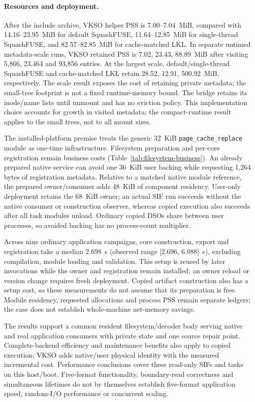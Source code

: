 \paragraph{Resources and deployment.}
After the include archive, VKSO helper PSS is 7.00--7.04~MiB, compared with 14.16--23.95~MiB for default SquashFUSE, 11.64--12.85~MiB for single-thread SquashFUSE, and 82.57--82.85~MiB for cache-matched LKL. In separate untimed metadata-scale runs, VKSO retained PSS is 7.02, 23.43, 88.89~MiB after visiting 5,866, 23,464 and 93,856 entries. At the largest scale, default/single-thread SquashFUSE and cache-matched LKL retain 28.52, 12.91, 500.92~MiB, respectively. The scale result exposes the cost of retaining private metadata; the small-tree footprint is not a fixed runtime-memory bound.
The bridge retains its inode/name lists until unmount and has no eviction
policy. This implementation choice accounts for growth in visited metadata;
the compact-runtime result applies to the small trees, not to all mount sizes.

The installed-platform premise treats the generic 32~KiB
\texttt{page\_cache\_replace} module as one-time infrastructure. Filesystem
preparation and per-core registration remain business costs
(Table~\ref{tab:filesystem-business}).
An already prepared native service can avoid one 36~KiB user backing while
requesting 1,264 bytes of registration metadata. Relative to a matched native
module reference, the prepared owner/consumer adds 48~KiB of component residency. User-only
deployment retains the 68~KiB owner; an actual SIF run succeeds without the
native consumer or construction observer, whereas copied execution also
succeeds after all task modules unload. Ordinary copied DSOs share between
user processes, so avoided backing has no process-count multiplier.

Across nine ordinary application campaigns, core construction, export and registration take a median 2.698~s (observed range [2.696, 6.088]~s), excluding compilation, module loading and validation. This setup is reused by later invocations while the owner and registration remain installed; an owner reload or version change requires fresh deployment. Copied artifact construction also has a setup cost, so these measurements do not assume that its preparation is free.
Module residency, requested allocations and process PSS remain separate
ledgers; the case does not establish whole-machine net-memory savings.

The results support a common resident filesystem/decoder body serving
native and real application consumers with private state and one source
repair point. Complete-backend efficiency and maintenance benefits also
apply to copied execution; VKSO adds native/user physical identity with the
measured incremental cost. Performance conclusions cover these read-only
SIFs and tasks on this host/boot. Five-format functionality, boundary-read
correctness and simultaneous lifetimes do not by themselves establish
five-format application speed, random-I/O performance or concurrent scaling.
